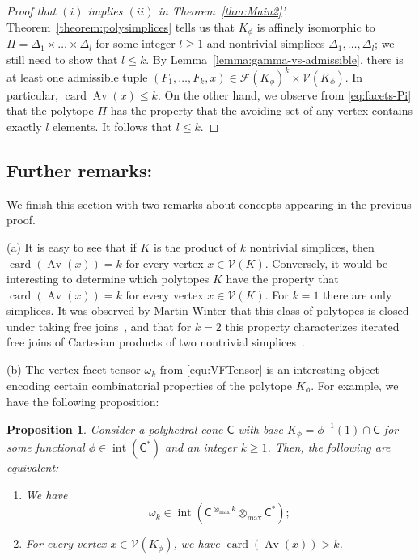 \documentclass{amsart}
\renewcommand{\leq}{\leqslant}
\renewcommand{\geq}{\geqslant}
\newcommand{\gC}{\mathsf{C}}
\DeclareMathOperator{\card}{\mathrm{card}}
\def\lb{\left(}
\def\rb{\right)}
\DeclareMathOperator{\inter}{int}
\DeclareMathOperator{\Av}{Av}
\theoremstyle{plain}
\newtheorem{proposition}[theorem]{Proposition}
\begin{document}
\begin{proof}[Proof that $(i)$ implies $(ii)$ in Theorem~\ref{thm:Main2}']
Theorem~\ref{theorem:polysimplices} tells us that $K_\phi$ is affinely isomorphic to $\Pi = \Delta_{1} \times \dots \times \Delta_{l}$ for some integer $l \geq 1$ and nontrivial simplices $\Delta_1,\dots,\Delta_l$; we still need to show that $l \leq k$.
By Lemma~\ref{lemma:gamma-vs-admissible}, there is at least one admissible tuple $(F_1,\dots,F_k,x) \in \mathcal{F}(K_\phi)^k \times \mathcal{V}(K_\phi)$. In particular,  $\card \Av(x) \leq k$. On the other hand, we observe from \eqref{eq:facets-Pi} that the polytope $\Pi$ has the property that the avoiding set of any vertex contains exactly $l$ elements. It follows that $l \leq k$.
\end{proof}



\subsection*{Further remarks:}
We finish this section with two remarks about concepts appearing in the previous proof.

\smallskip

(a) It is easy to see that if $K$ is the product of $k$ nontrivial simplices, then $\card (\Av\lb x\rb) = k$ for every vertex $x\in \mathcal{V}(K)$. Conversely, it would be interesting to determine which polytopes $K$ have the property that $\card (\Av\lb x\rb) = k$ for every vertex $x\in \mathcal{V}(K)$. For $k=1$ there are only simplices. It was observed by Martin Winter that this class of polytopes is closed under taking free joins~\cite{winterMO}, and that for $k=2$ this property characterizes iterated free joins of Cartesian products of two nontrivial simplices~\cite{WinterPC}.

\smallskip

(b) The vertex-facet tensor $\omega_k$ from
\eqref{equ:VFTensor} is an interesting object encoding certain combinatorial properties of the polytope $K_\phi$. For example, we have the following proposition:

\begin{proposition}\label{cor:VFtensorInclus}
Consider a polyhedral cone $\gC$ with base $K_\phi=\phi^{-1}(1)\cap \gC$ for some functional $\phi\in \inter(\gC^*)$ and an integer $k \geq 1$. Then, the following are equivalent:
\begin{enumerate}
\item[(i)] We have
\[
\omega_k\in \inter\lb \gC^{\otimes_{\max} k}\otimes_{\max} \gC^*\rb;
\]
\item[(ii)] For every vertex $x \in \mathcal{V}(K_\phi)$, we have $\card (\Av\lb x\rb)>k$.
\end{enumerate}
\end{proposition}
\end{document}
